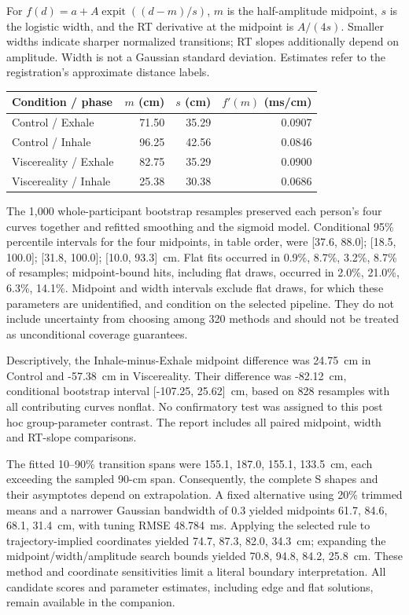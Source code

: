 For $f(d)=a+A\operatorname{expit}((d-m)/s)$, $m$ is the half-amplitude midpoint, $s$ is the logistic width, and the RT derivative at the midpoint is $A/(4s)$. Smaller widths indicate sharper normalized transitions; RT slopes additionally depend on amplitude. Width is not a Gaussian standard deviation. Estimates refer to the registration's approximate distance labels.

\begin{center}
\small
\begin{tabular}{lrrr}
Condition / phase & $m$ (cm) & $s$ (cm) & $f'(m)$ (ms/cm) \\
\hline
Control / Exhale & 71.50 & 35.29 & 0.0907 \\
Control / Inhale & 96.25 & 42.56 & 0.0846 \\
Viscereality / Exhale & 82.75 & 35.29 & 0.0900 \\
Viscereality / Inhale & 25.38 & 30.38 & 0.0686 \\
\end{tabular}
\end{center}

The 1{,}000 whole-participant bootstrap resamples preserved each person's four curves together and refitted smoothing and the sigmoid model. Conditional 95\% percentile intervals for the four midpoints, in table order, were [37.6, 88.0]; [18.5, 100.0]; [31.8, 100.0]; [10.0, 93.3]~cm. Flat fits occurred in 0.9\%, 8.7\%, 3.2\%, 8.7\% of resamples; midpoint-bound hits, including flat draws, occurred in 2.0\%, 21.0\%, 6.3\%, 14.1\%. Midpoint and width intervals exclude flat draws, for which these parameters are unidentified, and condition on the selected pipeline. They do not include uncertainty from choosing among 320 methods and should not be treated as unconditional coverage guarantees.

Descriptively, the Inhale-minus-Exhale midpoint difference was 24.75~cm in Control and -57.38~cm in Viscereality. Their difference was -82.12~cm, conditional bootstrap interval [-107.25, 25.62]~cm, based on 828 resamples with all contributing curves nonflat. No confirmatory test was assigned to this post hoc group-parameter contrast. The report includes all paired midpoint, width and RT-slope comparisons.

The fitted 10--90\% transition spans were 155.1, 187.0, 155.1, 133.5~cm, each exceeding the sampled 90-cm span. Consequently, the complete S shapes and their asymptotes depend on extrapolation. A fixed alternative using 20\% trimmed means and a narrower Gaussian bandwidth of 0.3 yielded midpoints 61.7, 84.6, 68.1, 31.4~cm, with tuning RMSE 48.784~ms. Applying the selected rule to trajectory-implied coordinates yielded 74.7, 87.3, 82.0, 34.3~cm; expanding the midpoint/width/amplitude search bounds yielded 70.8, 94.8, 84.2, 25.8~cm. These method and coordinate sensitivities limit a literal boundary interpretation. All candidate scores and parameter estimates, including edge and flat solutions, remain available in the companion.

